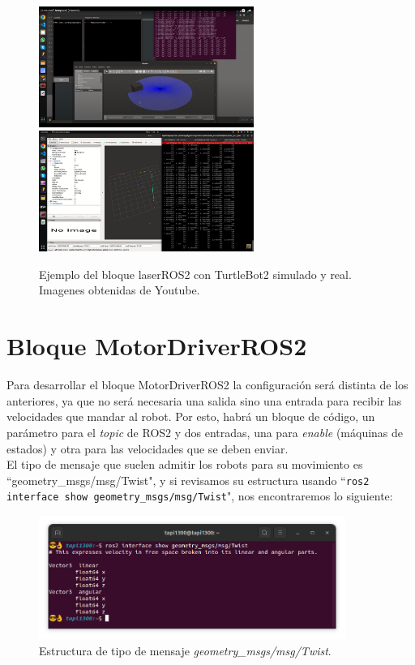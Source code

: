 \begin{figure} [H]
    \begin{center}
      \includegraphics[width=7cm]{figs/c4/laserS.png}
      \includegraphics[width=7cm]{figs/c4/laserR.png}
    \end{center}
    \caption[Ejemplo bloque láser ROS2]{Ejemplo del bloque laserROS2 con TurtleBot2 simulado y real. Imagenes obtenidas de Youtube\footnotemark.}
    \label{fig:vid_laserR}
\end{figure}

\section{Bloque MotorDriverROS2}
\label{sec:motordriverros2}
Para desarrollar el bloque MotorDriverROS2 la configuración será distinta de los anteriores, ya que no será necesaria una salida sino una entrada
para recibir las velocidades que mandar al robot. Por esto, habrá un bloque de código, un parámetro para el \textit{topic} de ROS2 y
dos entradas, una para \textit{enable} (máquinas de estados) y otra para las velocidades que se deben enviar.\\

El tipo de mensaje que suelen admitir los robots para su movimiento es ``geometry\_msgs/msg/Twist", y si revisamos su estructura
usando ``\lstinline|ros2 interface show geometry_msgs/msg/Twist|", nos encontraremos lo siguiente:
\begin{figure} [H]
  \begin{center}
      \includegraphics[width=10cm]{figs/c4/twist_struct.png}
  \end{center}
  \caption[Estructura mensaje Twist]{Estructura de tipo de mensaje \textit{geometry\_msgs/msg/Twist}.}
  \label{fig:twist_struct}
\end{figure}

